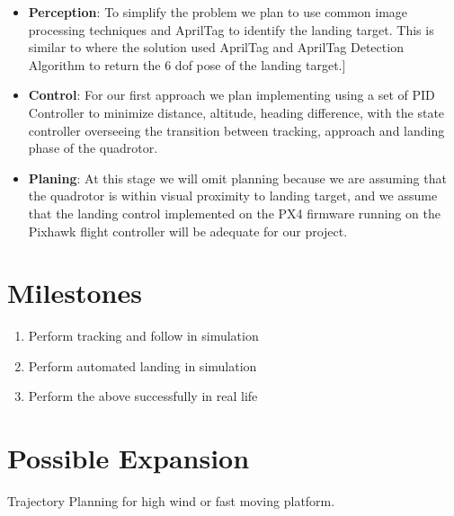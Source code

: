 \documentclass{article}
\begin{document}
\begin{itemize}
	\vspace{-0.2cm}
	\setlength{\itemsep}{5pt}
	\setlength{\parskip}{0pt}
	\setlength{\parsep}{0pt}

	\item{\textbf{Perception}: To simplify the problem we plan to use common image processing techniques and AprilTag to identify the landing target. This is similar to \cite{Ling2014} where the solution used AprilTag and AprilTag Detection Algorithm to return the 6 dof pose of the landing target.}]
	
	\item{\textbf{Control}: For our first approach we plan implementing using a set of PID Controller to minimize distance, altitude, heading difference, with the state controller overseeing the transition between tracking, approach and landing phase of the quadrotor.}
	
	\item{\textbf{Planing}: At this stage we will omit planning because we are assuming that the quadrotor is within visual proximity to landing target, and we assume that the landing control implemented on the PX4 firmware \cite{px4} running on the Pixhawk flight controller \cite{pixhawk} will be adequate for our project.}
	
	\vspace{-0.2cm}
\end{itemize}




\section*{Milestones}
\begin{enumerate}
	\item{Perform tracking and follow in simulation}
	\item{Perform automated landing in simulation}
	\item{Perform the above successfully in real life}
\end{enumerate}


\section*{Possible Expansion}

Trajectory Planning for high wind or fast moving platform.



{}

\end{document}
